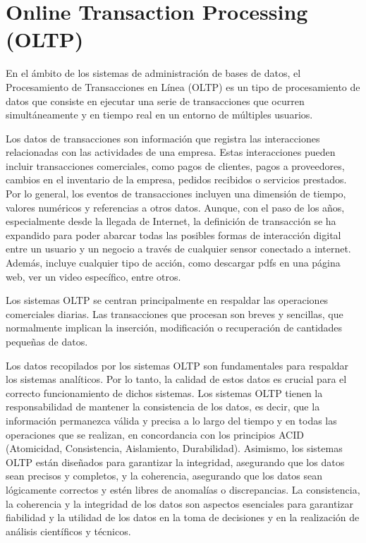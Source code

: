 \section{Online Transaction Processing (OLTP)} \label{section:oltp}

En el ámbito de los sistemas de administración de bases de datos, el Procesamiento de Transacciones en Línea (OLTP) es un 
tipo de procesamiento de datos que consiste en ejecutar una serie de transacciones que ocurren simultáneamente y en 
tiempo real en un entorno de múltiples usuarios\cite{harizopoulos2018oltp}.

Los datos de transacciones son información que registra las interacciones relacionadas con las actividades de una empresa. Estas 
interacciones pueden incluir transacciones comerciales, como pagos de clientes, pagos a proveedores, cambios en el inventario de la empresa, 
pedidos recibidos o servicios prestados. Por lo general, los eventos de transacciones incluyen una dimensión de tiempo, valores numéricos y 
referencias a otros datos\cite{oltpAzure}. Aunque, con el paso de los años, especialmente desde la llegada de 
Internet, la definición de transacción 
se ha expandido para poder abarcar todas las posibles formas de interacción digital entre un usuario y un negocio a través 
de cualquier sensor conectado a internet. Además, incluye cualquier tipo de acción, como descargar pdfs en una 
página web, ver un video específico, entre otros\cite{oltpOracle}.

Los sistemas OLTP se centran principalmente en respaldar las operaciones comerciales diarias. Las transacciones que procesan 
son breves y sencillas, que normalmente implican la inserción, modificación o recuperación de cantidades pequeñas de datos.

Los datos recopilados por los sistemas OLTP son fundamentales para respaldar los sistemas analíticos. Por lo tanto, la calidad de estos datos es 
crucial para el correcto funcionamiento de dichos sistemas. Los sistemas OLTP tienen la responsabilidad de mantener la consistencia de los datos, 
es decir, que la información permanezca válida y precisa a lo largo del tiempo y en todas las operaciones que se realizan, en concordancia con 
los principios ACID (Atomicidad, Consistencia, Aislamiento, Durabilidad). Asimismo, los sistemas OLTP están diseñados para garantizar la integridad, 
asegurando que los datos sean precisos y 
completos, y la coherencia, asegurando que los datos sean lógicamente correctos y estén libres de anomalías o discrepancias. La consistencia, la 
coherencia y la integridad de los datos son aspectos esenciales para garantizar fiabilidad y la utilidad de los datos en la toma de decisiones y en 
la realización de análisis científicos y técnicos.


